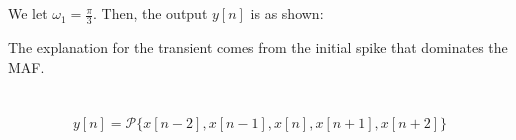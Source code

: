 \documentclass{article}
\begin{document}
\subsection{}

We let \(\omega_1 = \frac{\pi}{3}\).
Then, the output \(y[n]\) is as shown:
\begin{center}
\end{center}
The explanation for the transient comes from the initial spike that dominates the MAF.

\newpage
\section{}

\begin{equation}
    y[n] = \mathcal{P}\{x[n - 2], x[n - 1], x[n], x[n + 1], x[n + 2]\}
\end{equation}

\subsection{}
\end{document}
